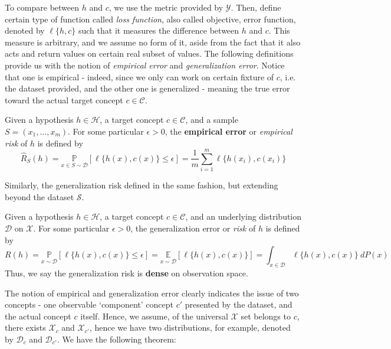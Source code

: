 To compare between $h$ and $c$, we use the metric provided by $\mathcal{Y}$. Then, define certain type of function called \textit{loss function}, also called objective, error function, denoted by $\ell\{h,c\}$ such that it measures the difference between $h$ and $c$. This measure is arbitrary, and we assume no form of it, aside from the fact that it also acts and return values on certain real subset of values. The following definitions provide us with the notion of \textit{empirical error} and \textit{generalization error}. Notice that one is empirical - indeed, since we only can work on certain fixture of $c$, i.e. the dataset provided, and the other one is generalized - meaning the true error toward the actual target concept $c\in\mathcal{C}$. 
\begin{definition}
    Given a hypothesis $h\in \mathcal{H}$, a target concept $c\in \mathcal{C}$, and a sample $S=(x_{1},\dots,x_{m})$. For some particular $\epsilon>0$, the \textbf{empirical error} or \textit{empirical risk} of $h$ is defined by\begin{equation}
        \hat{R}_{S}(h) = \underset{x\in S\sim\mathcal{D}}{\mathbb{P}} [\ell\{h(x),c(x)\}\leq \epsilon] =\frac{1}{m} \sum_{i=1}^{m} \ell\{h(x_i),c(x_i)\}
    \end{equation} 
\end{definition}
 Similarly, the generalization risk defined in the same fashion, but extending beyond the dataset $\mathcal{S}$. 
\begin{definition}
    Given a hypothesis $h\in\mathcal{H}$, a target concept $c\in\mathcal{C}$, and an underlying distribution $\mathcal{D}$ on $\mathcal{X}$. For some particular $\epsilon>0$, the generalization error or \textit{risk} of $h$ is defined by
    \begin{equation}
        R(h) = \underset{x\sim\mathcal{D}}{\mathbb{P}} [\ell\{h(x),c(x)\}\leq \epsilon] = \underset{x\sim\mathcal{D}}{\mathbb{E}}[\ell\{h(x),c(x)\}] = \int_{x\in \mathcal{D}} \ell\{h(x),c(x)\} \: dP(x)
    \end{equation} 
    Thus, we say the generalization risk is \textbf{dense} on observation space. 
\end{definition}

The notion of empirical and generalization error clearly indicates the issue of two concepts - one observable `component' concept $c'$ presented by the dataset, and the actual concept $c$ itself. Hence, we assume, of the universal $\mathcal{X}$ set belongs to $c$, there exists $\mathcal{X}_{c}$ and $\mathcal{X}_{c'}$, hence we have two distributions, for example, denoted by $\mathcal{D}_{c}$ and $\mathcal{D}_{c'}$. We have the following theorem:

